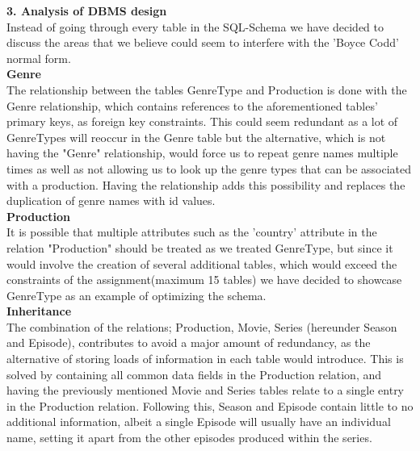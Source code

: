 \Large{\textbf{3. Analysis of DBMS design}}\\

\normalsize
Instead of going through every table in the SQL-Schema we have decided to discuss the areas that we believe could seem to interfere with the 'Boyce Codd' normal form.\\ 

\large \textbf{Genre}\\[0.4cm]
\normalsize
The relationship between the tables GenreType and Production is done with the Genre relationship, which contains references to the aforementioned tables' primary keys, as foreign key constraints. This could seem redundant as a lot of GenreTypes will reoccur in the Genre table but the alternative, which is not having the "Genre" relationship, would force us to repeat genre names multiple times as well as not allowing us to look up the genre types that can be associated with a production. Having the relationship adds this possibility and replaces the duplication of genre names with id values.\\

\large \textbf{Production}\\[0.4cm]
\normalsize
It is possible that multiple attributes such as the 'country' attribute in the relation "Production" should be treated as we treated GenreType, but since it would involve the creation of several additional tables, which would exceed the constraints of the assignment(maximum 15 tables) we have decided to showcase GenreType as an example of optimizing the schema.\\

\large \textbf{Inheritance}\\[0.4cm]
\normalsize
The combination of the relations; Production, Movie, Series (hereunder Season and Episode), contributes to avoid a major amount of redundancy, as the alternative of storing loads of information in each table would introduce. This is solved by containing all common data fields in the Production relation, and having the previously mentioned Movie and Series tables relate to a single entry in the Production relation. Following this, Season and Episode contain little to no additional information, albeit a single Episode will usually have an individual name, setting it apart from the other episodes produced within the series.

